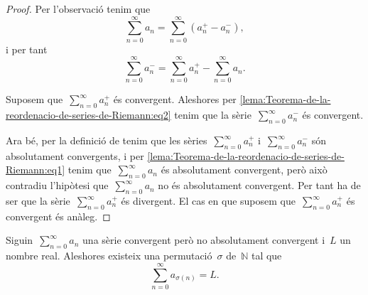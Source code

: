 \documentclass[../analisi-matematica.tex]{subfiles}
\begin{document}
    \begin{proof}
        Per l'observació  tenim que
        \begin{equation}
            \label{lema:Teorema-de-la-reordenacio-de-series-de-Riemann:eq1}
            \sum_{n=0}^{\infty}a_{n}=\sum_{n=0}^{\infty}\left(a^{+}_{n}-a^{-}_{n}\right),
        \end{equation}
        i per tant
        \begin{equation}
            \label{lema:Teorema-de-la-reordenacio-de-series-de-Riemann:eq2}
            \sum_{n=0}^{\infty}a^{-}_{n}=\sum_{n=0}^{\infty}a^{+}_{n}-\sum_{n=0}^{\infty}a_{n}.
        \end{equation}

        Suposem que~\(\sum_{n=0}^{\infty}a^{+}_{n}\) és convergent.
        Aleshores per \eqref{lema:Teorema-de-la-reordenacio-de-series-de-Riemann:eq2} tenim que la sèrie~\(\sum_{n=0}^{\infty}a^{-}_{n}\) és convergent.

        Ara bé, per la definició de  tenim que les sèries~\(\sum_{n=0}^{\infty}a^{+}_{n}\) i~\(\sum_{n=0}^{\infty}a^{-}_{n}\) són absolutament convergents, i per \eqref{lema:Teorema-de-la-reordenacio-de-series-de-Riemann:eq1} tenim que~\(\sum_{n=0}^{\infty}a_{n}\) és absolutament convergent, però això contradiu l'hipòtesi que~\(\sum_{n=0}^{\infty}a_{n}\) no és absolutament convergent.
        Per tant ha de ser que la sèrie~\(\sum_{n=0}^{\infty}a^{+}_{n}\) és divergent.
        El cas en que suposem que~\(\sum_{n=0}^{\infty}a^{+}_{n}\) és convergent és anàleg.
    \end{proof}
    \begin{theorem}
        \label{thm:Teorema-de-la-reordenacio-de-series-de-Riemann}
        Siguin~\(\sum_{n=0}^{\infty}a_{n}\) una sèrie convergent però no absolutament convergent i~\(L\) un nombre real.
        Aleshores existeix una permutació~\(\sigma\) de~\(\mathbb{N}\) tal que
        \[
            \sum_{n=0}^{\infty}a_{\sigma(n)}=L.
        \]
    \end{theorem}
\end{document}
